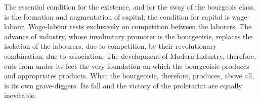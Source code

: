The essential condition for the existence, and for the sway of the
bourgeois class, is the formation and augmentation of capital; the
condition for capital is wage-labour. Wage-labour rests exclusively on
competition between the laborers. The advance of industry, whose
involuntary promoter is the bourgeoisie, replaces the isolation of the
labourers, due to competition, by their revolutionary combination, due
to association. The development of Modern Industry, therefore, cuts
from under its feet the very foundation on which the bourgeoisie
produces and appropriates products. What the bourgeoisie, therefore,
produces, above all, is its own grave-diggers. Its fall and the victory
of the proletariat are equally inevitable.


